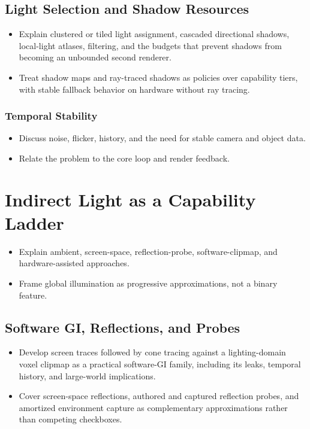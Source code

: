 \documentclass[
  11pt,
  letterpaper,
  DIV=11,
  numbers=noendperiod,
  twoside,
  open=right]{scrreprt}
\providecommand{\tightlist}{%
  \setlength{\itemsep}{0pt}\setlength{\parskip}{0pt}}
\begin{document}
\subsection{Light Selection and Shadow
Resources}\label{light-selection-and-shadow-resources}

\begin{itemize}
\tightlist
\item
  Explain clustered or tiled light assignment, cascaded directional
  shadows, local-light atlases, filtering, and the budgets that prevent
  shadows from becoming an unbounded second renderer.
\item
  Treat shadow maps and ray-traced shadows as policies over capability
  tiers, with stable fallback behavior on hardware without ray tracing.
\end{itemize}

\subsubsection{Temporal Stability}\label{temporal-stability}

\begin{itemize}
\tightlist
\item
  Discuss noise, flicker, history, and the need for stable camera and
  object data.
\item
  Relate the problem to the core loop and render feedback.
\end{itemize}

\section{Indirect Light as a Capability
Ladder}\label{indirect-light-as-a-capability-ladder}

\begin{itemize}
\tightlist
\item
  Explain ambient, screen-space, reflection-probe, software-clipmap, and
  hardware-assisted approaches.
\item
  Frame global illumination as progressive approximations, not a binary
  feature.
\end{itemize}

\subsection{Software GI, Reflections, and
Probes}\label{software-gi-reflections-and-probes}

\begin{itemize}
\tightlist
\item
  Develop screen traces followed by cone tracing against a
  lighting-domain voxel clipmap as a practical software-GI family,
  including its leaks, temporal history, and large-world implications.
\item
  Cover screen-space reflections, authored and captured reflection
  probes, and amortized environment capture as complementary
  approximations rather than competing checkboxes.
\end{itemize}
\end{document}
